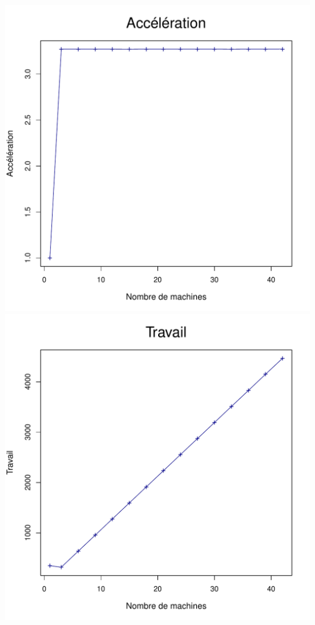\documentclass[a4paper, 11pt, titlepage]{article}
\begin{document}
\begin{center}
    \includegraphics[scale=0.45]{res/sujet_makefiles_premier_Makefile_nth8_acc.pdf}
    \includegraphics[scale=0.45]{res/sujet_makefiles_premier_Makefile_nth8_work.pdf}
\end{center}
\end{document}
